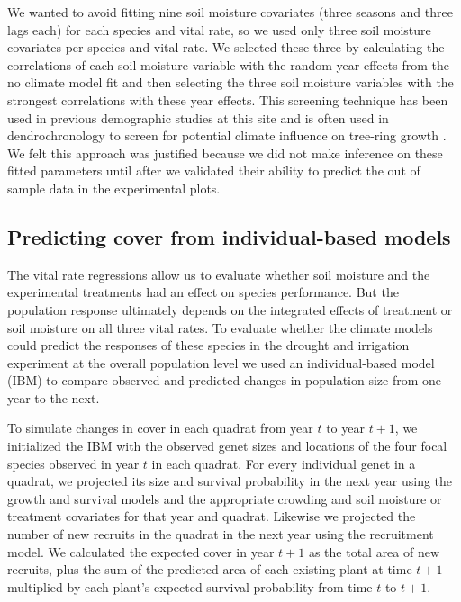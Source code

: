 \documentclass[11pt]{article}
\begin{document}
\begin{doublespacing}
We wanted to avoid fitting nine soil moisture covariates (three seasons and three lags each) for each species and vital rate, so we used only three soil moisture covariates per species and vital rate. We selected these three by calculating the correlations of each soil moisture variable with the random year effects from the no climate model fit and then selecting the three soil moisture variables with the strongest correlations with these year effects. This screening technique has been used in previous demographic studies at this site \citep{dalgleish_climate_2010} and is often used in dendrochronology to screen for potential climate influence on tree-ring growth \citep{wang_temporal_2003}. We felt this approach was justified because we did not make inference on these fitted parameters until after we validated their ability to predict the out of sample data in the experimental plots. 

\subsection*{Predicting cover from individual-based models}

The vital rate regressions allow us to evaluate whether soil moisture and the experimental treatments had an effect on species performance. But the population response ultimately depends on the integrated effects of treatment or soil moisture on all three vital rates.  To evaluate whether the climate models could predict the responses of these species in the drought and irrigation experiment at the overall population level we used an individual-based model (IBM) to compare observed and predicted changes in population size from one year to the next. 

To simulate changes in cover in each quadrat from year $t$ to year $t+1$, we initialized the IBM with the observed genet sizes and locations of the four focal species observed in year $t$ in each quadrat. For every individual genet in a quadrat, we projected its size and survival probability in the next year using the growth and survival models and the appropriate crowding and soil moisture or treatment covariates for that year and quadrat.  Likewise we projected the number of new recruits in the quadrat in the next year using the recruitment model. We calculated the expected cover in year $t+1$ as the total area of new recruits, plus the sum of the predicted area of each existing plant at time $t+1$ multiplied by each plant's expected survival probability from time $t$ to $t+1$. 


\end{doublespacing}
\end{document}
